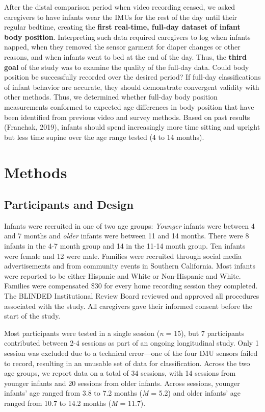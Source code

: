 \documentclass[
  man]{apa6}
\begin{document}
After the distal comparison period when video recording ceased, we asked caregivers to have infants wear the IMUs for the rest of the day until their regular bedtime, creating the \textbf{first real-time, full-day dataset of infant body position}. Interpreting such data required caregivers to log when infants napped, when they removed the sensor garment for diaper changes or other reasons, and when infants went to bed at the end of the day. Thus, the \textbf{third goal} of the study was to examine the quality of the full-day data. Could body position be successfully recorded over the desired period? If full-day classifications of infant behavior are accurate, they should demonstrate convergent validity with other methods. Thus, we determined whether full-day body position measurements conformed to expected age differences in body position that have been identified from previous video and survey methods. Based on past results (Franchak, 2019), infants should spend increasingly more time sitting and upright but less time supine over the age range tested (4 to 14 months).

\hypertarget{methods}{%
\section{Methods}\label{methods}}

\hypertarget{participants-and-design}{%
\subsection{Participants and Design}\label{participants-and-design}}

Infants were recruited in one of two age groups: \emph{Younger} infants were between 4 and 7 months and \emph{older} infants were between 11 and 14 months. There were 8 infants in the 4-7 month group and 14 in the 11-14 month group. Ten infants were female and 12 were male. Families were recruited through social media advertisements and from community events in Southern California. Most infants were reported to be either Hispanic and White or Non-Hispanic and White. Families were compensated \$30 for every home recording session they completed. The BLINDED Institutional Review Board reviewed and approved all procedures associated with the study. All caregivers gave their informed consent before the start of the study.

Most participants were tested in a single session (\emph{n} = 15), but 7 participants contributed between 2-4 sessions as part of an ongoing longitudinal study. Only 1 session was excluded due to a technical error---one of the four IMU sensors failed to record, resulting in an unusable set of data for classification. Across the two age groups, we report data on a total of 34 sessions, with 14 sessions from younger infants and 20 sessions from older infants. Across sessions, younger infants' age ranged from 3.8 to 7.2 months (\emph{M} = 5.2) and older infants' age ranged from 10.7 to 14.2 months (\emph{M} = 11.7).
\end{document}
